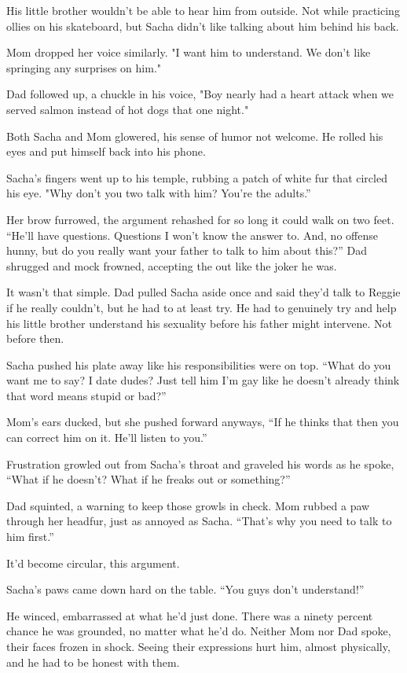 His little brother wouldn't be able to hear him from
outside. Not while practicing ollies on his skateboard, but Sacha didn't
like talking about him behind his
back.

Mom dropped her voice similarly. "I want him to understand.
We don't like springing any surprises on
him."

Dad followed up, a chuckle in his voice, "Boy nearly had a
heart attack when we served salmon instead of hot dogs that one
night."

Both Sacha and Mom glowered, his sense of humor not welcome.
He rolled his eyes and put himself back into his
phone.

Sacha's fingers went up to his temple, rubbing a patch of
white fur that circled his eye. "Why don't you two talk with him? You're
the
adults.''

Her brow furrowed, the argument rehashed for so long it
could walk on two feet. ``He'll have questions. Questions I won't know
the answer to. And, no offense hunny, but do you really want your father
to talk to him about this?'' Dad shrugged and mock frowned, accepting
the out like the joker he
was.

It wasn't that simple. Dad pulled Sacha aside once and said
they'd talk to Reggie if he really couldn't, but he had to at least try.
He had to genuinely try and help his little brother understand his
sexuality before his father might intervene. Not before
then.

Sacha pushed his plate away like his responsibilities were
on top. ``What do you want me to say? I date dudes? Just tell him I'm
gay like he doesn't already think that word means stupid or
bad?''

Mom's ears ducked, but she pushed forward anyways, ``If he
thinks that then you can correct him on it. He'll listen to
you.''

Frustration growled out from Sacha's throat and graveled his
words as he spoke, ``What if he doesn't? What if he freaks out or
something?''

Dad squinted, a warning to keep those growls in check. Mom
rubbed a paw through her headfur, just as annoyed as Sacha. ``That's why
you need to talk to him
first.''

It'd become circular, this
argument.

Sacha's paws came down hard on the table. ``You guys don't
understand!''

He winced, embarrassed at what he'd just done. There was a
ninety percent chance he was grounded, no matter what he'd do. Neither
Mom nor Dad spoke, their faces frozen in shock. Seeing their expressions
hurt him, almost physically, and he had to be honest with
them.

